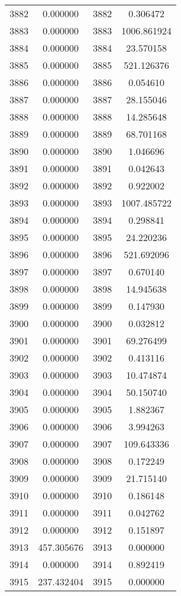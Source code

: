 \documentclass[12pt]{article}
\begin{document}
\begin{longtable}{@{}cccc@{}}
3882 & 0.000000 & 3882 & 0.306472 \\
3883 & 0.000000 & 3883 & 1006.861924 \\
3884 & 0.000000 & 3884 & 23.570158 \\
3885 & 0.000000 & 3885 & 521.126376 \\
3886 & 0.000000 & 3886 & 0.054610 \\
3887 & 0.000000 & 3887 & 28.155046 \\
3888 & 0.000000 & 3888 & 14.285648 \\
3889 & 0.000000 & 3889 & 68.701168 \\
3890 & 0.000000 & 3890 & 1.046696 \\
3891 & 0.000000 & 3891 & 0.042643 \\
3892 & 0.000000 & 3892 & 0.922002 \\
3893 & 0.000000 & 3893 & 1007.485722 \\
3894 & 0.000000 & 3894 & 0.298841 \\
3895 & 0.000000 & 3895 & 24.220236 \\
3896 & 0.000000 & 3896 & 521.692096 \\
3897 & 0.000000 & 3897 & 0.670140 \\
3898 & 0.000000 & 3898 & 14.945638 \\
3899 & 0.000000 & 3899 & 0.147930 \\
3900 & 0.000000 & 3900 & 0.032812 \\
3901 & 0.000000 & 3901 & 69.276499 \\
3902 & 0.000000 & 3902 & 0.413116 \\
3903 & 0.000000 & 3903 & 10.474874 \\
3904 & 0.000000 & 3904 & 50.150740 \\
3905 & 0.000000 & 3905 & 1.882367 \\
3906 & 0.000000 & 3906 & 3.994263 \\
3907 & 0.000000 & 3907 & 109.643336 \\
3908 & 0.000000 & 3908 & 0.172249 \\
3909 & 0.000000 & 3909 & 21.715140 \\
3910 & 0.000000 & 3910 & 0.186148 \\
3911 & 0.000000 & 3911 & 0.042762 \\
3912 & 0.000000 & 3912 & 0.151897 \\
3913 & 457.305676 & 3913 & 0.000000 \\
3914 & 0.000000 & 3914 & 0.892419 \\
3915 & 237.432404 & 3915 & 0.000000 \\

\end{longtable}
\end{document}
